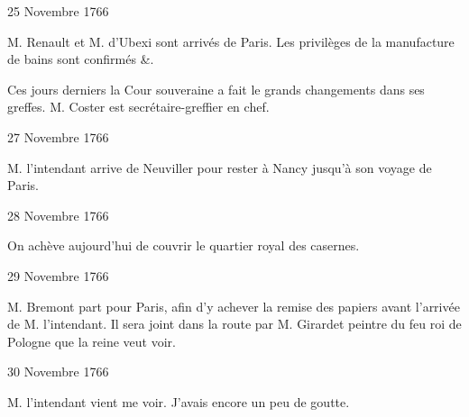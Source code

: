                      \begin{diary}{25 Novembre 1766}{}


                           M. Renault et M. d’Ubexi sont arrivés
                           de Paris. Les privilèges de
                              la manufacture
                              de bains sont confirmés \&. \bigskip


                         Ces jours derniers la Cour souveraine
                           a fait le grands changements dans ses greffes.
                           M. Coster est
                           secrétaire-greffier en chef. \bigskip


                     \end{diary}

                     \begin{diary}{27 Novembre 1766}{}


                           M. l’intendant arrive de Neuviller pour
                           rester à Nancy jusqu’à son
                           voyage de Paris. \bigskip


                     \end{diary}

                     \begin{diary}{28 Novembre 1766}{}

                         On achève aujourd'hui de couvrir
                              le
                              quartier royal des casernes. \bigskip


                     \end{diary}

                     \begin{diary}{29 Novembre 1766}{}


                           M. Bremont part pour Paris, afin d’y
                           achever la remise des papiers avant
                           l’arrivée de M. l’intendant.
                           Il sera joint
                           dans la route par M. Girardet
                           peintre
                           du feu roi de Pologne que la
                              reine veut voir. \bigskip


                     \end{diary}

                     \begin{diary}{30 Novembre 1766}{}


                           M. l’intendant vient me voir.
                           J’avais
                           encore un peu de goutte. \bigskip


                     \end{diary}
